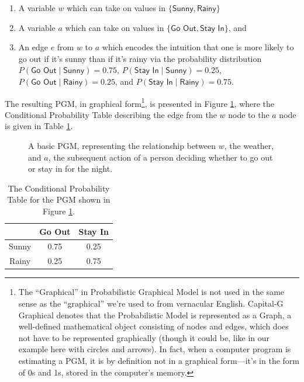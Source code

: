 \documentclass[11pt]{article}
\begin{document}
\begin{enumerate}
	\item A variable $w$ which can take on values in $\{\textsf{Sunny}, \textsf{Rainy}\}$
	\item A variable $a$ which can take on values in $\{\textsf{Go Out}, \textsf{Stay In}\}$, and 
	\item An edge $e$ from $w$ to $a$ which encodes the intuition that one is more likely to go out if it's sunny than if it's rainy via the probability distribution $P(\textsf{Go Out} \; | \; \textsf{Sunny}) = 0.75$, $P(\textsf{Stay In} \; | \; \textsf{Sunny}) = 0.25$, $P(\textsf{Go Out} \; | \; \textsf{Rainy}) = 0.25$, and $P(\textsf{Stay In} \; | \; \textsf{Rainy}) = 0.75$.
\end{enumerate}

The resulting PGM, in graphical form\footnote{The ``Graphical'' in Probabilistic Graphical Model is not used in the same sense as the ``graphical'' we're used to from vernacular English. Capital-G Graphical denotes that the Probabilistic Model is represented as a Graph, a well-defined mathematical object consisting of nodes and edges, which does not have to be represented graphically (though it could be, like in our example here with circles and arrows). In fact, when a computer program is estimating a PGM, it is by definition not in a graphical form---it's in the form of 0s and 1s, stored in the computer's memory.}, is presented in Figure \ref{fig:pgm1}, where the Conditional Probability Table describing the edge from the $w$ node to the $a$ node is given in Table \ref{tab:cpt1}.

\begin{figure}[ht!]
	\centering
	\caption{A basic PGM, representing the relationship between $w$, the weather, and $a$, the subsequent action of a person deciding whether to go out or stay in for the night.}
	\label{fig:pgm1}
\end{figure}


\begin{table}[ht!]
	\centering
	\begin{tabular}{c|cc}
		& \textsf{Go Out} & \textsf{Stay In} \\\hline
		\textsf{Sunny} & 0.75 & 0.25 \\
		\textsf{Rainy} & 0.25 & 0.75 \\
	\end{tabular}
	\caption{The Conditional Probability Table for the PGM shown in Figure \ref{fig:pgm1}.}
	\label{tab:cpt1}
\end{table}
\end{document}

